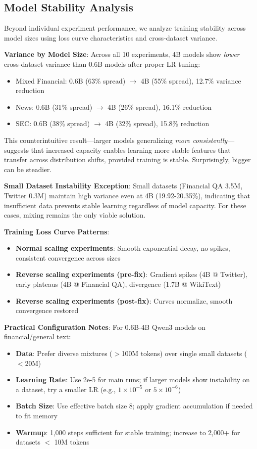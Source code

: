 \subsection{Model Stability Analysis}

Beyond individual experiment performance, we analyze training stability across model sizes using loss curve characteristics and cross-dataset variance.

\textbf{Variance by Model Size}: Across all 10 experiments, 4B models show \textit{lower} cross-dataset variance than 0.6B models after proper LR tuning:
\begin{itemize}
\item Mixed Financial: 0.6B (63\% spread) $\to$ 4B (55\% spread), 12.7\% variance reduction
\item News: 0.6B (31\% spread) $\to$ 4B (26\% spread), 16.1\% reduction
\item SEC: 0.6B (38\% spread) $\to$ 4B (32\% spread), 15.8\% reduction
\end{itemize}

This counterintuitive result—larger models generalizing \textit{more consistently}—suggests that increased capacity enables learning more stable features that transfer across distribution shifts, provided training is stable. Surprisingly, bigger can be steadier.

\textbf{Small Dataset Instability Exception}: Small datasets (Financial QA 3.5M, Twitter 0.3M) maintain high variance even at 4B (19.92-20.35\%), indicating that insufficient data prevents stable learning regardless of model capacity. For these cases, mixing remains the only viable solution.

\textbf{Training Loss Curve Patterns}:
\begin{itemize}
\item \textbf{Normal scaling experiments}: Smooth exponential decay, no spikes, consistent convergence across sizes
\item \textbf{Reverse scaling experiments (pre-fix)}: Gradient spikes (4B @ Twitter), early plateaus (4B @ Financial QA), divergence (1.7B @ WikiText)
\item \textbf{Reverse scaling experiments (post-fix)}: Curves normalize, smooth convergence restored
\end{itemize}

\textbf{Practical Configuration Notes}: For 0.6B-4B Qwen3 models on financial/general text:
\begin{itemize}
\item \textbf{Data}: Prefer diverse mixtures ($>$100M tokens) over single small datasets ($<$20M)
\item \textbf{Learning Rate}: Use 2e-5 for main runs; if larger models show instability on a dataset, try a smaller LR (e.g., $1\times10^{-5}$ or $5\times10^{-6}$)
\item \textbf{Batch Size}: Use effective batch size 8; apply gradient accumulation if needed to fit memory
\item \textbf{Warmup}: 1,000 steps sufficient for stable training; increase to 2,000+ for datasets $<$ 10M tokens
\end{itemize}

